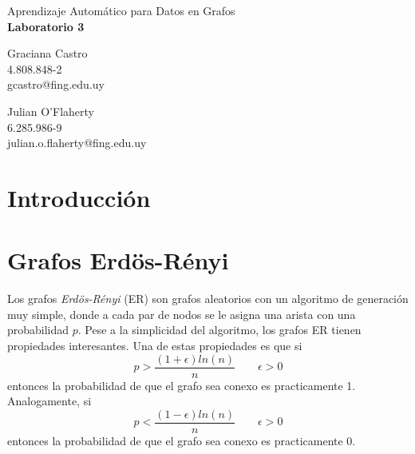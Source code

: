 \documentclass{article}
\begin{document}
\begin{center}
    {\Large Aprendizaje Automático para Datos en Grafos} \\
    {\LARGE \textbf{Laboratorio 3}} \\
    \vspace{2em}
    \begin{minipage}{0.45\textwidth}
        \centering
        Graciana Castro \\
        4.808.848-2 \\
        gcastro@fing.edu.uy
    \end{minipage}
    \hfill
    \begin{minipage}{0.45\textwidth}
        \centering
        Julian O'Flaherty \\
        6.285.986-9 \\
        julian.o.flaherty@fing.edu.uy
    \end{minipage}
\end{center}


\section{Introducción}


\section{Grafos Erdös-Rényi}

Los grafos \emph{Erdös-Rényi}\cite{erdos1959random} (ER) son grafos aleatorios con un algoritmo de generación muy simple, donde
a cada par de nodos se le asigna una arista con una probabilidad $p$. Pese a la simplicidad del algoritmo,
los grafos ER tienen propiedades interesantes. Una de estas propiedades es que si 
\begin{equation}
    \label{eq:er_threshold_1}
    p > \frac{(1 + \epsilon)ln(n)}{n} \quad\quad \epsilon > 0
\end{equation}
entonces la probabilidad de que el grafo sea conexo es practicamente 1. Analogamente,
si 
\begin{equation}
    \label{eq:er_threshold_2}
    p < \frac{(1 - \epsilon)ln(n)}{n} \quad\quad \epsilon > 0
\end{equation}
entonces la probabilidad de que el grafo sea conexo es practicamente 0.
\end{document}
